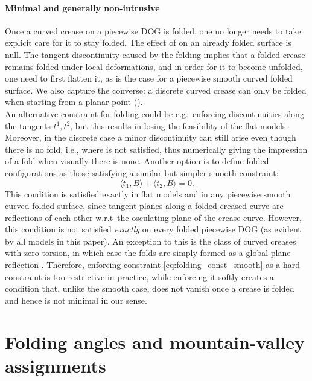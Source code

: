 \paragraph{Minimal and generally non-intrusive} 
Once a curved crease on a piecewise DOG is folded, one no longer needs to take explicit care for it to stay folded. The effect of  on an already folded surface is null. The tangent discontinuity caused by the folding implies that a folded crease remains folded under local deformations, and in order for it to become unfolded, one need to first flatten it, as is the case for a piecewise smooth curved folded surface. We also capture the converse: a discrete curved crease can only be folded when starting from a planar point (). \\

An alternative constraint for folding could be e.g.\ enforcing discontinuities along the tangents $t^1,t^2$, but this results in losing the feasibility of the flat models. Moreover, in the discrete case a minor discontinuity can still arise even though there is no fold, i.e., where  is not satisfied, thus numerically giving the impression of a fold when visually there is none. Another option is to define folded configurations as those satisfying a similar but simpler smooth constraint:
%
\begin{equation} \label{eq:folding_const_smooth} 
\langle t_1,B\rangle + \langle t_2,B\rangle = 0.
\end{equation}
%
This condition is satisfied exactly in flat models and in any piecewise smooth curved folded surface, since tangent planes along a folded creased curve are reflections of each other w.r.t\ the osculating plane of the crease curve. However, this condition is not satisfied \emph{exactly} on every folded piecewise DOG (as evident by all models in this paper). An exception to this is the class of curved creases with zero torsion, in which case the folds are simply formed as a global plane reflection \cite{Mitani_ref}. Therefore, enforcing constraint \eqref{eq:folding_const_smooth} as a hard constraint is too restrictive in practice, while enforcing it softly creates a condition that, unlike the smooth case, does not vanish once a crease is folded and hence is not minimal in our sense.


\section{Folding angles and mountain-valley assignments} \label{sec:folding_angles_mountain_valley}

